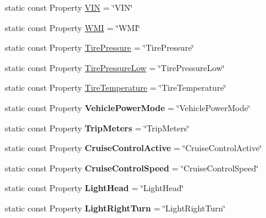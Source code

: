\begin{DoxyCompactItemize}
\item 
static const Property \hyperlink{classVehicleProperty_ae72c1c7de185f330862c62dfb9d93a34}{V\-I\-N} = \char`\"{}V\-I\-N\char`\"{}
\item 
static const Property \hyperlink{classVehicleProperty_a32f980d900d97cf94171ea9fa25408e0}{W\-M\-I} = \char`\"{}W\-M\-I\char`\"{}
\item 
static const Property \hyperlink{classVehicleProperty_a4709c7da616ca84dd4533562319d9bb8}{Tire\-Pressure} = \char`\"{}Tire\-Pressure\char`\"{}
\item 
static const Property \hyperlink{classVehicleProperty_a39e0314efcb1040a285d8d71ff5cd701}{Tire\-Pressure\-Low} = \char`\"{}Tire\-Pressure\-Low\char`\"{}
\item 
static const Property \hyperlink{classVehicleProperty_a6ec2a936e26226d1cb9fb84262e6adc2}{Tire\-Temperature} = \char`\"{}Tire\-Temperature\char`\"{}
\item 
\hypertarget{classVehicleProperty_a80cc1f343da6754346e4bcc0cc7ae009}{static const Property {\bfseries Vehicle\-Power\-Mode} = \char`\"{}Vehicle\-Power\-Mode\char`\"{}}\label{classVehicleProperty_a80cc1f343da6754346e4bcc0cc7ae009}

\item 
\hypertarget{classVehicleProperty_a893b05cb0e292082070458efa6066e91}{static const Property {\bfseries Trip\-Meters} = \char`\"{}Trip\-Meters\char`\"{}}\label{classVehicleProperty_a893b05cb0e292082070458efa6066e91}

\item 
\hypertarget{classVehicleProperty_a3203c1cb22ff3b530a887228096863e5}{static const Property {\bfseries Cruise\-Control\-Active} = \char`\"{}Cruise\-Control\-Active\char`\"{}}\label{classVehicleProperty_a3203c1cb22ff3b530a887228096863e5}

\item 
\hypertarget{classVehicleProperty_a50c00b5a2d7cfd500a1cd7473124c737}{static const Property {\bfseries Cruise\-Control\-Speed} = \char`\"{}Cruise\-Control\-Speed\char`\"{}}\label{classVehicleProperty_a50c00b5a2d7cfd500a1cd7473124c737}

\item 
\hypertarget{classVehicleProperty_ae98356a8b49f28837a94b13094156e90}{static const Property {\bfseries Light\-Head} = \char`\"{}Light\-Head\char`\"{}}\label{classVehicleProperty_ae98356a8b49f28837a94b13094156e90}

\item 
\hypertarget{classVehicleProperty_a73cfc2a3afd2dc81f495936dfcf46793}{static const Property {\bfseries Light\-Right\-Turn} = \char`\"{}Light\-Right\-Turn\char`\"{}}\label{classVehicleProperty_a73cfc2a3afd2dc81f495936dfcf46793}


\end{DoxyCompactItemize}
